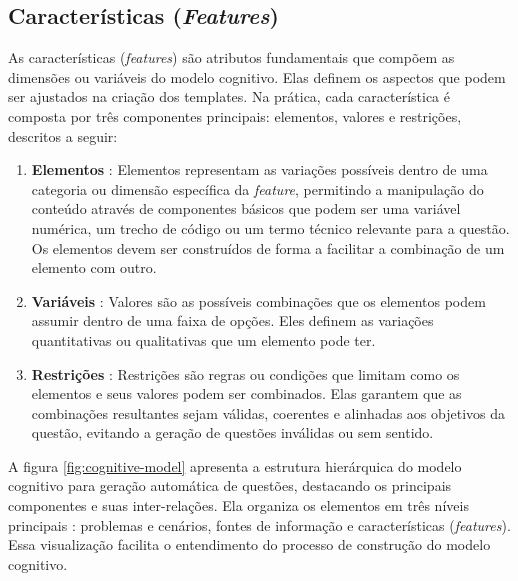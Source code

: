 \subsection{Características (\textit{Features})}

As características (\textit{features}) são atributos fundamentais que compõem as dimensões ou variáveis do modelo cognitivo. Elas definem os aspectos que podem ser ajustados na criação dos templates. Na prática, cada característica é composta por três componentes principais: elementos, valores e restrições, descritos a seguir:

\begin{enumerate}
\item \textbf{Elementos} : Elementos representam as variações possíveis dentro de uma categoria ou dimensão específica da \textit{feature}, permitindo a manipulação do conteúdo através de componentes básicos que podem ser uma variável numérica, um trecho de código ou um termo técnico relevante para a questão. Os elementos devem ser construídos de forma a facilitar a combinação de um elemento com outro.

\item \textbf{Variáveis} : Valores são as possíveis combinações que os elementos podem assumir dentro de uma faixa de opções. Eles definem as variações quantitativas ou qualitativas que um elemento pode ter.

\item \textbf{Restrições} : Restrições são regras ou condições que limitam como os elementos e seus valores podem ser combinados. Elas garantem que as combinações resultantes sejam válidas, coerentes e alinhadas aos objetivos da questão, evitando a geração de questões inválidas ou sem sentido.

\end{enumerate}


A figura \ref{fig:cognitive-model} apresenta a estrutura hierárquica do modelo cognitivo para geração automática de questões, destacando os principais componentes e suas inter-relações. Ela organiza os elementos em três níveis principais : problemas e cenários, fontes de informação e características (\textit{features}). Essa visualização facilita o entendimento do processo de construção do modelo cognitivo.

